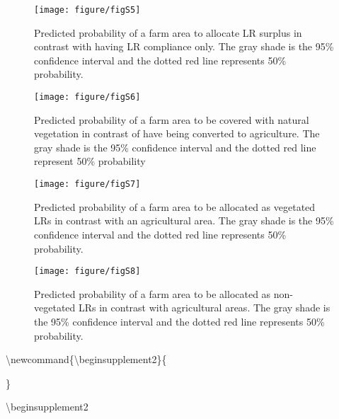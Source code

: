 \documentclass[
	12pt,				%
	oneside,			%
	a4paper,			%
	chapter=TITLE,		%
	section=TITLE,		%
	brazil,			%
	english				%
	]{abntex2}
\begin{document}
\begin{figure}[H]

{\centering \texttt{[image: figure/figS5]} 

}

\caption{Predicted probability of a farm area to allocate LR surplus in contrast with having LR compliance only. The gray shade is the 95\% confidence interval and the dotted red line represents 50\% probability. }\label{fig:figureS5}
\end{figure}
\begin{figure}[H]

{\centering \texttt{[image: figure/figS6]} 

}

\caption{Predicted probability of a farm area to be covered with natural vegetation in contrast of have being converted to agriculture. The gray shade is the 95\% confidence interval and the dotted red line represent 50\% probability }\label{fig:figureS6}
\end{figure}
\begin{figure}[H]

{\centering \texttt{[image: figure/figS7]} 

}

\caption{Predicted probability of a farm area to be allocated as vegetated LRs in contrast with an agricultural area. The gray shade is the 95\% confidence interval and the dotted red line represents 50\% probability.}\label{fig:figureS7}
\end{figure}
\begin{figure}[H]

{\centering \texttt{[image: figure/figS8]} 

}

\caption{Predicted probability of a farm area to be allocated as non-vegetated LRs in contrast with agricultural areas. The gray shade is the 95\% confidence interval and the dotted red line represents 50\% probability.}\label{fig:figureS8}
\end{figure}
\textbackslash newcommand\{\textbackslash beginsupplement2\}\{
\setcounter{table}{0}\\

\renewcommand{\thetable}{B\arabic{table}} 
  \setcounter{figure}{0} 
  \renewcommand{\thefigure}{B\arabic{figure}}

\}

\textbackslash beginsupplement2
\end{document}
